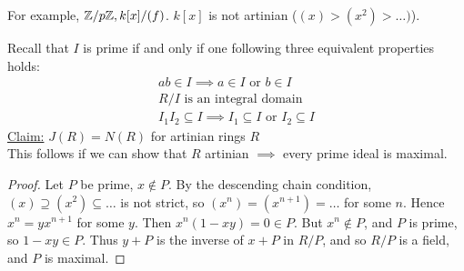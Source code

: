\documentclass[10pt,a4paper]{article}
\begin{document}
For example, $\mathbb{Z}/p\mathbb{Z}, k[x]/(f)$. $k[x]$ is not artinian ($(x) >(x^2) > \ldots)$).

Recall that $I$ is prime if and only if one following three equivalent properties holds:
\begin{align*}
  ab \in I \implies a \in I \text{ or } b \in I\\
  R/I \text{ is an integral domain}\\
  I_1I_2 \subseteq I \implies I_1 \subseteq I \text{ or }I_2 \subseteq I
\end{align*}
\underline{Claim:} $J(R) = N(R)$ for artinian rings $R$\\
This follows if we can show that $R$ artinian $\implies$ every prime ideal is maximal.
\begin{proof}
  Let $P$ be prime, $x \notin P$. By the descending chain condition, $(x) \supseteq (x^2) \subseteq \ldots$ is not strict, so $(x^n) = (x^{n+1}) = \ldots$ for some $n$. Hence $x^n = yx^{n+1}$ for some $y$. Then $x^n(1-xy) = 0 \in P$. But $x^n \notin P$, and $P$ is prime, so $1-xy \in P$. Thus $y+P$ is the inverse of $x+P$ in $R/P$, and so $R/P$ is a field, and $P$ is maximal.
\end{proof}
\end{document}
